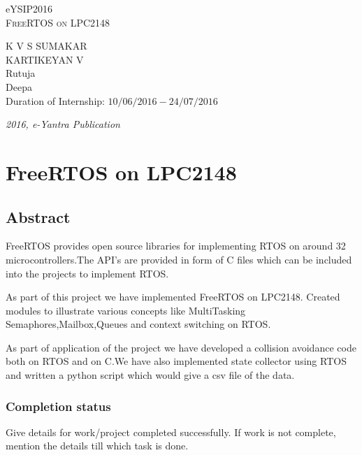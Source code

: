 \documentclass[a4paper,12pt,oneside]{book}
\begin{document}
\begin{titlepage}
\raggedright
{\Large eYSIP2016\\[1cm]}
{\Huge\scshape FreeRTOS on LPC2148 \\[.1in]}
\vfill
\begin{flushright}
{\large K V S SUMAKAR \\}
{\large KARTIKEYAN V \\}
{\large Rutuja \\}
{\large Deepa \\}
{\large Duration of Internship: $ 10/06/2016-24/07/2016 $ \\}
\end{flushright}

{\itshape 2016, e-Yantra Publication}
\end{titlepage}
\tableofcontents
\newpage
\chapter[FreeRTOS on LPC2148]{FreeRTOS on LPC2148}

\section*{Abstract}

FreeRTOS provides open source libraries for implementing RTOS on around 32 microcontrollers.The API's are provided in form of C files which can be included into the projects to implement RTOS.

As part of this project we have implemented FreeRTOS on LPC2148.
Created modules to illustrate various concepts like MultiTasking Semaphores,Mailbox,Queues and context switching on RTOS.

As part of application of the project we have developed a collision avoidance code both on RTOS and on C.We have also implemented state collector using RTOS and written a python script which would give a csv file of the data.
\subsection*{Completion status}
Give details for work/project completed successfully. If work is not
complete, mention the details till which task is done.
\end{document}
